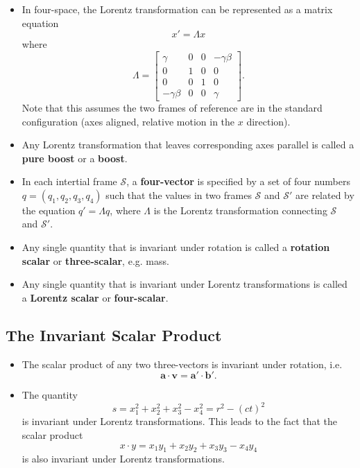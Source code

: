 \documentclass{article}
\renewcommand{\vec}[1]{\boldsymbol{\mathbf{#1}}}
\begin{document}
\begin{itemize}
  \item In four-space, the Lorentz transformation can be represented as a matrix equation \[x' = \Lambda x\] where \[\Lambda = \begin{bmatrix}
            \gamma        & 0 & 0 & -\gamma \beta \\
            0             & 1 & 0 & 0             \\
            0             & 0 & 1 & 0             \\
            -\gamma \beta & 0 & 0 & \gamma
          \end{bmatrix}.\] Note that this assumes the two frames of reference are in the standard configuration (axes aligned, relative motion in the $x$ direction).

  \item Any Lorentz transformation that leaves corresponding axes parallel is called a \textbf{pure boost} or a \textbf{boost}.

  \item In each intertial frame $\mathcal{S}$, a \textbf{four-vector} is specified by a set of four numbers $q = (q_1, q_2, q_3, q_4)$ such that the values in two frames $\mathcal{S}$ and $\mathcal{S}'$ are related by the equation $q' = \Lambda q$, where $\Lambda$ is the Lorentz transformation connecting $\mathcal{S}$ and $\mathcal{S}'$.

  \item Any single quantity that is invariant under rotation is called a \textbf{rotation scalar} or \textbf{three-scalar}, e.g. mass.

  \item Any single quantity that is invariant under Lorentz transformations is called a \textbf{Lorentz scalar} or \textbf{four-scalar}.
\end{itemize}

\subsection{The Invariant Scalar Product}

\begin{itemize}
  \item The scalar product of any two three-vectors is invariant under rotation, i.e. \[\vec{a} \cdot \vec{v} = \vec{a}' \cdot \vec{b}'.\]

  \item The quantity \[s = x_1^2 + x_2^2 + x_3^2 - x_4^2 = r^2 - (c t)^2\] is invariant under Lorentz transformations. This leads to the fact that the scalar product \[x \cdot y = x_1 y_1 + x_2 y_2 + x_3 y_3 - x_4 y_4\] is also invariant under Lorentz transformations.
\end{itemize}
\end{document}
